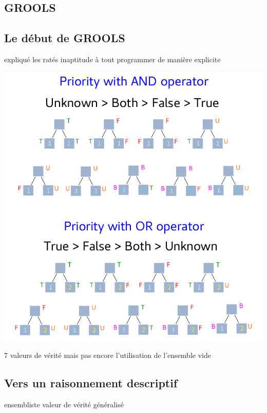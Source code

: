 \begin{refsegment}
\chapter{GROOLS}
\section{Le début de GROOLS}
expliqué les ratés
inaptitude à tout programmer de manière explicite


\begin{shadedfigure}
    \centering
    \includegraphics[width=\textwidth]{img/four_values_priorities_rules.pdf}
    \caption{  }
    \label{fig:seven_truth_values}
\end{shadedfigure}



7 valeurs de vérité mais pas encore l'utilisation de l'ensemble vide


\section{Vers un raisonnement descriptif}
ensembliste valeur de vérité généralisé




\end{refsegment}

